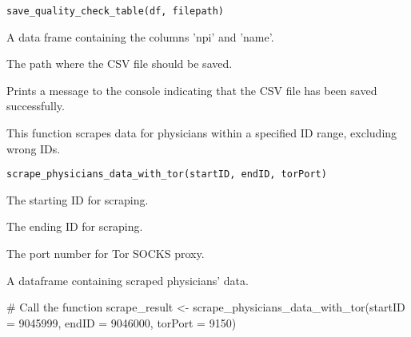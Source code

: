 \documentclass[a4paper]{book}
\begin{document}
%
\begin{Usage}
\begin{verbatim}
save_quality_check_table(df, filepath)
\end{verbatim}
\end{Usage}
%
\begin{Arguments}
\begin{ldescription}
\item[\code{df}] A data frame containing the columns 'npi' and 'name'.

\item[\code{filepath}] The path where the CSV file should be saved.
\end{ldescription}
\end{Arguments}
%
\begin{Value}
Prints a message to the console indicating that the CSV file has been saved successfully.
\end{Value}
%
\begin{Description}
This function scrapes data for physicians within a specified ID range, excluding wrong IDs.
\end{Description}
%
\begin{Usage}
\begin{verbatim}
scrape_physicians_data_with_tor(startID, endID, torPort)
\end{verbatim}
\end{Usage}
%
\begin{Arguments}
\begin{ldescription}
\item[\code{startID}] The starting ID for scraping.

\item[\code{endID}] The ending ID for scraping.

\item[\code{torPort}] The port number for Tor SOCKS proxy.
\end{ldescription}
\end{Arguments}
%
\begin{Value}
A dataframe containing scraped physicians' data.
\end{Value}
%
\begin{Examples}
\begin{ExampleCode}
# Call the function
scrape_result <- scrape_physicians_data_with_tor(startID = 9045999, endID = 9046000, torPort = 9150)

\end{ExampleCode}
\end{Examples}
\end{document}

